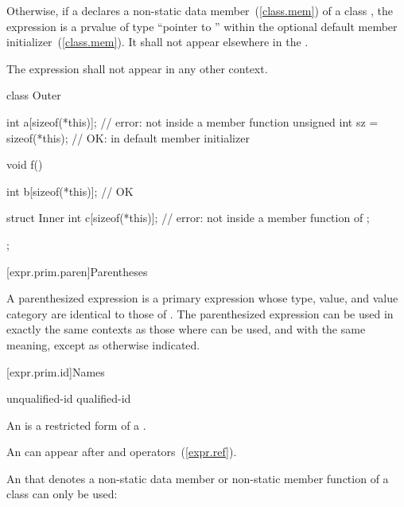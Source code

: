 \pnum
Otherwise, if a  declares a non-static data
member~(\ref{class.mem}) of a class , the expression  is
a prvalue of type ``pointer to '' within the
optional default member initializer~(\ref{class.mem}). It shall not appear elsewhere
in the .

\pnum
The expression  shall not appear in any other context.
\begin{example}
\begin{codeblock}
class Outer {
  int a[sizeof(*this)];               // error: not inside a member function
  unsigned int sz = sizeof(*this);    // OK: in default member initializer

  void f() {
    int b[sizeof(*this)];             // OK

    struct Inner {
      int c[sizeof(*this)];           // error: not inside a member function of 
    };
  }
};
\end{codeblock}
\end{example}

[expr.prim.paren]{Parentheses}

\pnum
{}%
A parenthesized expression 
is a primary expression whose type, value, and value category are identical to those of .
The parenthesized expression can be used in exactly the same contexts as
those where  can be used, and with the same
meaning, except as otherwise indicated.

[expr.prim.id]{Names}

\begin{bnf}
\br
    unqualified-id\br
    qualified-id
\end{bnf}

\pnum
{}%
%
An  is a restricted form of a
.
\begin{note}
An  can appear after  and \tcode{->}
operators~(\ref{expr.ref}).
\end{note}

\pnum
An  that denotes a non-static data member or
non-static member function of a class can only be used:

